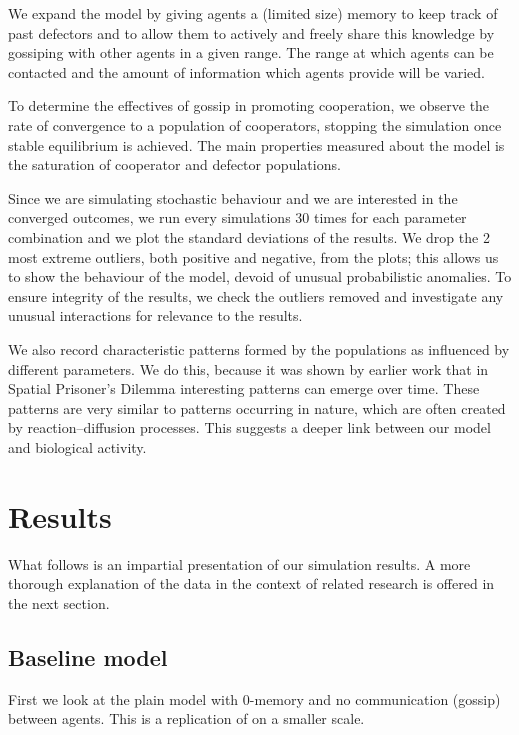 \documentclass[runningheads]{llncs}
\begin{document}
We expand the model by giving agents a (limited size) memory to keep track of past defectors and to allow them to actively and freely share this knowledge by gossiping with other agents in a given range.
The range at which agents can be contacted and the amount of information which agents provide will be varied.

To determine the effectives of gossip in promoting cooperation, we observe the rate of convergence to a population of cooperators, stopping the simulation once stable equilibrium is achieved.
The main properties measured about the model is the saturation of cooperator and defector populations.

Since we are simulating stochastic behaviour and we are interested in the converged outcomes,
we run every simulations 30 times for each parameter combination and we plot the standard deviations of the results.
We drop the 2 most extreme outliers, both positive and negative, from the plots; this allows us to show the behaviour of the model, devoid of unusual probabilistic anomalies.
To ensure integrity of the results, we check the outliers removed and investigate any unusual interactions for relevance to the results.

We also record characteristic patterns formed by the populations as influenced by different parameters.
We do this, because it was shown by earlier work \cite{spatial-patterns} that in Spatial Prisoner's Dilemma interesting patterns can emerge over time.
These patterns are very similar to patterns occurring in nature, which are often created by reaction--diffusion processes.
This suggests a deeper link between our model and biological activity.
%
%
%
\section{Results}
What follows is an impartial presentation of our simulation results.
A more thorough explanation of the data in the context of related research
is offered in the next section.

\subsection{Baseline model}
First we look at the plain model with 0-memory and no communication (gossip) between agents.
This is a replication of \cite{smaldino} on a smaller scale.
\end{document}
